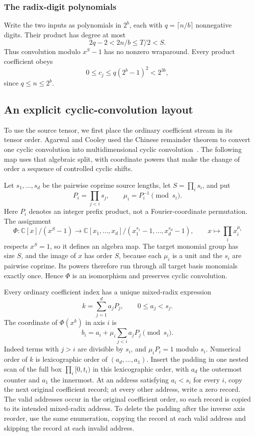 \documentclass[11pt]{article}
\theoremstyle{definition}
\begin{document}
\subsubsection{The radix-digit polynomials}

Write the two inputs as polynomials in $2^b$, each with
$q=\lceil n/b\rceil$ nonnegative digits.  Their product has degree at most
\[
 2q-2<2n/b\le T/2<S.
\]
Thus convolution modulo $x^S-1$ has no nonzero wraparound.  Every product
coefficient obeys
\begin{equation}\label{eq:capacity}
 0\le c_j\le q(2^b-1)^2<2^{3b},
\end{equation}
since $q\le n\le2^b$.

\subsection{An explicit cyclic-convolution layout}

To use the source tensor, we first place the ordinary coefficient stream
in its tensor order. Agarwal and Cooley used the Chinese remainder
theorem to convert one cyclic convolution into multidimensional cyclic
convolution~\cite{AgarwalCooley1977}. The following map uses that
algebraic split, with coordinate powers that make the change of order a
sequence of controlled cyclic shifts.

Let $s_1,\ldots,s_d$ be the pairwise coprime
source lengths, let $S=\prod_i s_i$, and put
\[
 P_i=\prod_{j<i}s_j,\qquad \mu_i=P_i^{-1}\pmod{s_i}.
\]
Here $P_i$ denotes an integer prefix product, not a Fourier-coordinate
permutation.  The assignment
\[
 \Phi:\mathbb C[x]/(x^S-1)\longrightarrow
 \mathbb C[x_1,\ldots,x_d]/(x_1^{s_1}-1,\ldots,x_d^{s_d}-1),
 \qquad x\longmapsto\prod_i x_i^{\mu_i}
\]
respects $x^S=1$, so it defines an algebra map.  The target monomial
group has size $S$, and the image of $x$ has order $S$, because each
$\mu_i$ is a unit and the $s_i$ are pairwise coprime.  Its powers
therefore run through all target basis monomials exactly once.  Hence
$\Phi$ is an isomorphism and preserves cyclic convolution.

Every ordinary coefficient index has a unique mixed-radix expression
\[
 k=\sum_{j=1}^d a_jP_j,\qquad 0\le a_j<s_j.
\]
The coordinate of $\Phi(x^k)$ in axis $i$ is
\begin{equation}\label{eq:triangular-crt}
 b_i=a_i+\mu_i\sum_{j<i}a_jP_j\pmod{s_i}.
\end{equation}
Indeed terms with $j>i$ are divisible by $s_i$, and $\mu_iP_i=1$ modulo
$s_i$.  Numerical order of $k$ is lexicographic order of
$(a_d,\ldots,a_1)$.  Insert the padding in one nested scan of the full
box $\prod_i[0,t_i)$ in this lexicographic order, with $a_d$ the
outermost counter and $a_1$ the innermost.  At an address satisfying
$a_i<s_i$ for every $i$, copy the next original coefficient record;
at every other address, write a zero record.  The valid addresses
occur in the original coefficient order, so each record is copied to
its intended mixed-radix address.  To delete the padding after the
inverse axis reorder, use the same enumeration, copying the record at
each valid address and skipping the record at each invalid address.
\end{document}
